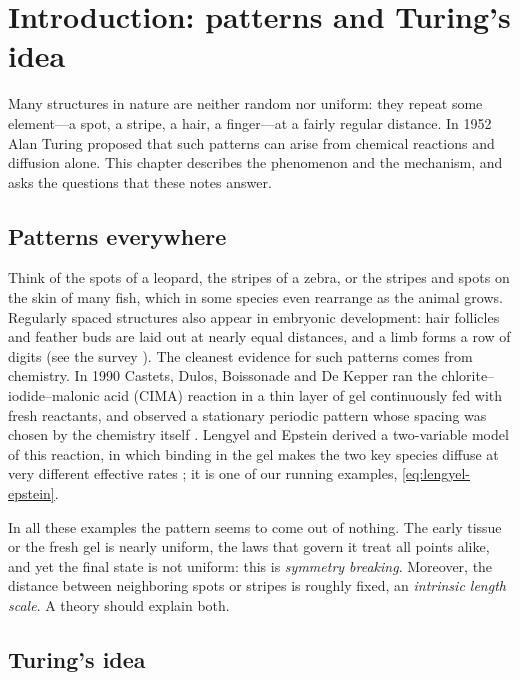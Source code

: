 \chapter{Introduction: patterns and Turing's idea}\label{ch:introduction}

Many structures in nature are neither random nor uniform: they repeat some
element---a spot, a stripe, a hair, a finger---at a fairly regular distance. In
1952 Alan Turing proposed that such patterns can arise from chemical reactions and
diffusion alone. This chapter describes the phenomenon and the mechanism, and asks
the questions that these notes answer.

\section{Patterns everywhere}\label{sec:intro-patterns}

Think of the spots of a leopard, the stripes of a zebra, or the stripes and spots
on the skin of many fish, which in some species even rearrange as the animal grows.
Regularly spaced structures also appear in embryonic development: hair follicles and
feather buds are laid out at nearly equal distances, and a limb forms a row of
digits (see the survey \cite{KondoMiura2010}). The cleanest evidence for such
patterns comes from chemistry. In 1990 Castets, Dulos, Boissonade and De Kepper ran
the chlorite--iodide--malonic acid (CIMA) reaction in a thin layer of gel continuously fed with fresh reactants, and
observed a stationary periodic pattern whose spacing was chosen by the chemistry
itself \cite{Castets1990}. Lengyel and Epstein derived a two-variable model of this
reaction, in which binding in the gel makes the two key species diffuse at very
different effective rates \cite{LengyelEpstein1991}; it is one of our running
examples, \eqref{eq:lengyel-epstein}.

In all these examples the pattern seems to come out of nothing. The early tissue or
the fresh gel is nearly uniform, the laws that govern it treat all points alike, and
yet the final state is not uniform: this is \emph{symmetry breaking}. Moreover, the
distance between neighboring spots or stripes is roughly fixed, an \emph{intrinsic
length scale}. A theory should explain both.

\section{Turing's idea}\label{sec:intro-turing}

